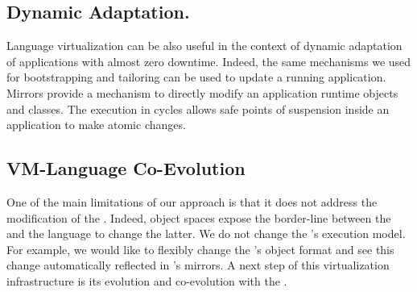 \subsection{Dynamic Adaptation.} Language virtualization can be also useful in the context of dynamic adaptation of applications with almost zero downtime. Indeed, the same mechanisms we used for bootstrapping and tailoring can be used to update a running application. Mirrors provide a mechanism to directly modify an application runtime objects and classes. The execution in cycles allows safe points of suspension inside an application to make atomic changes.

\subsection{VM-Language Co-Evolution} One of the main limitations of our approach is that it does not address the modification of the \VM. Indeed, object spaces expose the border-line between the \VM and the language to change the latter. We do not change the \VM's execution model. For example, we would like to flexibly change the \VM's object format and see this change automatically reflected in \Vtt's mirrors. A next step of this virtualization infrastructure is its evolution and co-evolution with the \VM.

%
%
%
%
%
%

